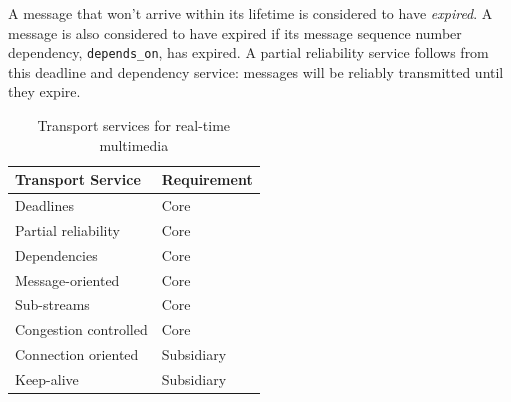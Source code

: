 \documentclass[10pt]{sig-alternate-05-2015}
\begin{document}
A message that won't arrive within its lifetime is considered to have
\emph{expired}. A message is also considered to have expired if its
message sequence number dependency, \texttt{depends\_on},
has expired. A partial reliability service follows
from this deadline and dependency service: messages will be reliably
transmitted until they expire.

\begin{table}
  \small
  \centering
  \begin{tabular}{ll}
    \toprule
      Transport Service     & Requirement \\
    \midrule
      Deadlines             & Core        \\
      Partial reliability   & Core        \\
      Dependencies          & Core        \\
      Message-oriented      & Core        \\
      Sub-streams           & Core        \\
      Congestion controlled & Core        \\
      Connection oriented   & Subsidiary  \\
      Keep-alive            & Subsidiary  \\
    \bottomrule
  \end{tabular}
  \caption{Transport services for real-time multimedia}
  \label{tab:services}
\end{table}
\end{document}
